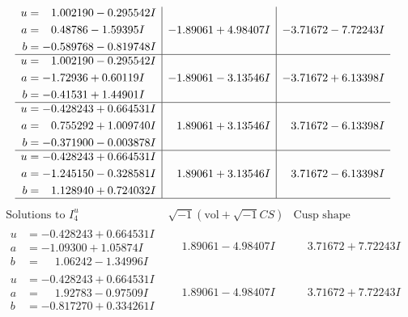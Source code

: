 \documentclass[1p]{elsarticle_modified}
\theoremstyle{definition}
\newcommand{\I}{\sqrt{-1}}
\begin{document}
$$\begin{array}{c|c|c}
\begin{aligned}
u &= \phantom{-}1.002190 - 0.295542 I \\
a &= \phantom{-}0.48786 - 1.59395 I \\
b &= -0.589768 - 0.819748 I\end{aligned}
 & -1.89061 + 4.98407 I & -3.71672 - 7.72243 I \\ \hline\begin{aligned}
u &= \phantom{-}1.002190 - 0.295542 I \\
a &= -1.72936 + 0.60119 I \\
b &= -0.41531 + 1.44901 I\end{aligned}
 & -1.89061 - 3.13546 I & -3.71672 + 6.13398 I \\ \hline\begin{aligned}
u &= -0.428243 + 0.664531 I \\
a &= \phantom{-}0.755292 + 1.009740 I \\
b &= -0.371900 - 0.003878 I\end{aligned}
 & \phantom{-}1.89061 + 3.13546 I & \phantom{-}3.71672 - 6.13398 I \\ \hline\begin{aligned}
u &= -0.428243 + 0.664531 I \\
a &= -1.245150 - 0.328581 I \\
b &= \phantom{-}1.128940 + 0.724032 I\end{aligned}
 & \phantom{-}1.89061 + 3.13546 I & \phantom{-}3.71672 - 6.13398 I\\
 \hline 
 \end{array}$$\newpage$$\begin{array}{c|c|c}  
\text{Solutions to }I^u_{4}& \I (\text{vol} + \sqrt{-1}CS) & \text{Cusp shape}\\
 \hline 
\begin{aligned}
u &= -0.428243 + 0.664531 I \\
a &= -1.09300 + 1.05874 I \\
b &= \phantom{-}1.06242 - 1.34996 I\end{aligned}
 & \phantom{-}1.89061 - 4.98407 I & \phantom{-}3.71672 + 7.72243 I \\ \hline\begin{aligned}
u &= -0.428243 + 0.664531 I \\
a &= \phantom{-}1.92783 - 0.97509 I \\
b &= -0.817270 + 0.334261 I\end{aligned}
 & \phantom{-}1.89061 - 4.98407 I & \phantom{-}3.71672 + 7.72243 I \\ \hline\begin{aligned}

\end{aligned}
\end{array}$$
\end{document}
